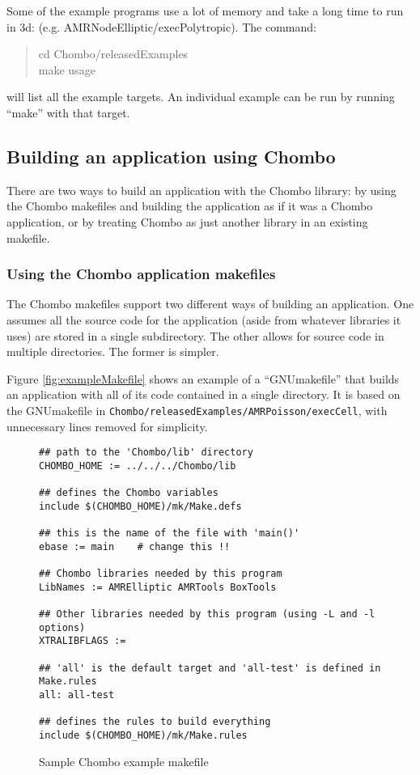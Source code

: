 Some of the example programs use a lot of memory and take a long time to run
in 3d: (e.g. AMRNodeElliptic/execPolytropic).  The command:
\begin{quote}
  cd Chombo/releasedExamples\\
  make usage
\end{quote}
will list all the example targets.  An individual example can be run by
running ``make'' with that target.


\subsection{Building an application using Chombo}

There are two ways to build an application with the Chombo library: by using
the Chombo makefiles and building the application as if it was a Chombo
application, or by treating Chombo as just another library in an existing
makefile.

\subsubsection{Using the Chombo application makefiles}

The Chombo makefiles support two different ways of building an application.
One assumes all the source code for the application (aside from whatever
libraries it uses) are stored in a single subdirectory.  The other allows
for source code in multiple directories.  The former is simpler.

Figure \ref{fig:exampleMakefile} shows an example of a ``GNUmakefile''
that builds an application with all of its code contained in a single
directory.  It is based on the GNUmakefile in  
\mbox{{\tt Chombo/releasedExamples/AMRPoisson/execCell}},
with unnecessary lines removed for simplicity.
\begin{figure}
\begin{verbatim}
## path to the 'Chombo/lib' directory
CHOMBO_HOME := ../../../Chombo/lib

## defines the Chombo variables
include $(CHOMBO_HOME)/mk/Make.defs

## this is the name of the file with 'main()'
ebase := main    # change this !!

## Chombo libraries needed by this program
LibNames := AMRElliptic AMRTools BoxTools

## Other libraries needed by this program (using -L and -l options)
XTRALIBFLAGS := 

## 'all' is the default target and 'all-test' is defined in Make.rules
all: all-test

## defines the rules to build everything
include $(CHOMBO_HOME)/mk/Make.rules
\end{verbatim}
\caption{\protect{\label{fig:exampleMakefile}}
Sample Chombo example makefile}
\end{figure}

